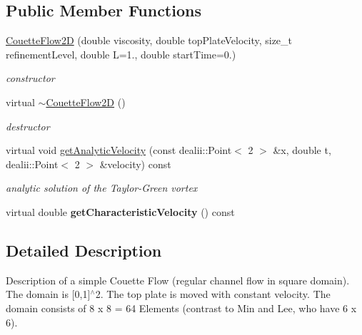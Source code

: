 \subsection*{Public Member Functions}
\begin{DoxyCompactItemize}
\item 
\hyperlink{classnatrium_1_1CouetteFlow2D_ac5abfdca75a910fb11cad175942de50f}{Couette\-Flow2\-D} (double viscosity, double top\-Plate\-Velocity, size\-\_\-t refinement\-Level, double L=1., double start\-Time=0.)
\begin{DoxyCompactList}\small\item\em constructor \end{DoxyCompactList}\item 
\hypertarget{classnatrium_1_1CouetteFlow2D_a97b61b0f71dc653427ba3db46e185873}{virtual \hyperlink{classnatrium_1_1CouetteFlow2D_a97b61b0f71dc653427ba3db46e185873}{$\sim$\-Couette\-Flow2\-D} ()}\label{classnatrium_1_1CouetteFlow2D_a97b61b0f71dc653427ba3db46e185873}

\begin{DoxyCompactList}\small\item\em destructor \end{DoxyCompactList}\item 
\hypertarget{classnatrium_1_1CouetteFlow2D_a3953d81acbab33424dfc4135930253df}{virtual void \hyperlink{classnatrium_1_1CouetteFlow2D_a3953d81acbab33424dfc4135930253df}{get\-Analytic\-Velocity} (const dealii\-::\-Point$<$ 2 $>$ \&x, double t, dealii\-::\-Point$<$ 2 $>$ \&velocity) const }\label{classnatrium_1_1CouetteFlow2D_a3953d81acbab33424dfc4135930253df}

\begin{DoxyCompactList}\small\item\em analytic solution of the Taylor-\/\-Green vortex \end{DoxyCompactList}\item 
\hypertarget{classnatrium_1_1CouetteFlow2D_a74429d98c455a0c06430a665505d8375}{virtual double {\bfseries get\-Characteristic\-Velocity} () const }\label{classnatrium_1_1CouetteFlow2D_a74429d98c455a0c06430a665505d8375}

\end{DoxyCompactItemize}


\subsection{Detailed Description}
Description of a simple Couette Flow (regular channel flow in square domain). The domain is \mbox{[}0,1\mbox{]}$^\wedge$2. The top plate is moved with constant velocity. The domain consists of 8 x 8 = 64 Elements (contrast to Min and Lee, who have 6 x 6). 

